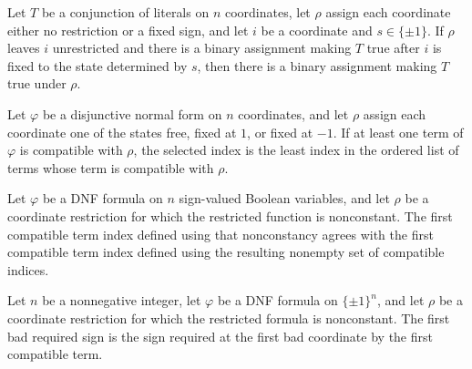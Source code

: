\begin{theorem}
\label{FABL.DNFTerm.compatible_of_fixCoordinate}
\leanok
{}
Let $T$ be a conjunction of literals on $n$ coordinates, let $\rho$ assign each
coordinate either no restriction or a fixed sign, and let $i$ be a coordinate and
$s\in\{\pm1\}$. If $\rho$ leaves $i$ unrestricted and there is a binary assignment
making $T$ true after $i$ is fixed to the state determined by $s$, then there is a
binary assignment making $T$ true under $\rho$.
\end{theorem}

\begin{definition}
\label{FABL.DNFFormula.firstCompatibleTermIndexOf}
\leanok
{}
Let $\varphi$ be a disjunctive normal form on $n$ coordinates, and let $\rho$ assign
each coordinate one of the states free, fixed at $1$, or fixed at $-1$. If at least one
term of $\varphi$ is compatible with $\rho$, the selected index is the least index in
the ordered list of terms whose term is compatible with $\rho$.
\end{definition}

\begin{theorem}
\label{FABL.DNFFormula.firstCompatibleTermIndex_eq_firstCompatibleTermIndexOf}
\leanok
{}
Let $\varphi$ be a DNF formula on $n$ sign-valued Boolean variables, and let $\rho$ be a
coordinate restriction for which the restricted function is nonconstant. The first
compatible term index defined using that nonconstancy agrees with the first compatible
term index defined using the resulting nonempty set of compatible indices.
\end{theorem}

\begin{definition}
\label{FABL.DNFFormula.firstBadRequiredSign}
\leanok
{}
Let $n$ be a nonnegative integer, let $\varphi$ be a DNF formula on $\{\pm1\}^n$, and
let $\rho$ be a coordinate restriction for which the restricted formula is nonconstant.
The first bad required sign is the sign required at the first bad coordinate by the
first compatible term.
\end{definition}

